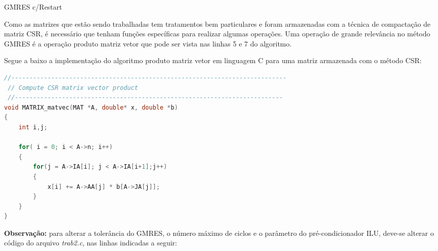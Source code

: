 \documentclass[
	11pt,				%
	oneside,			%
	a4paper,			%
	english,			%
	brazil,				%
	]{article}
\begin{document}
\begin{algorithm}[H]
	\caption{GMRES c/Restart}
\end{algorithm}

Como as matrizes que estão sendo trabalhadas tem tratamentos bem particulares e foram armazenadas com a técnica de compactação de matriz CSR, é necessário que tenham funções específicas para realizar algumas operações. Uma operação de grande relevância no método GMRES é a operação produto matriz vetor que pode ser vista nas linhas 5 e 7 do algoritmo.

Segue a baixo a implementação do algoritmo produto matriz vetor em linguagem C para uma matriz armazenada com o método CSR:

\begin{lstlisting}[language=C, caption=Produto Matriz Vetor (CSR)]
//----------------------------------------------------------------------------
 // Compute CSR matrix vector product
 //--------------------------------------------------------------------------
void MATRIX_matvec(MAT *A, double* x, double *b)
{
	int i,j;

	for( i = 0; i < A->n; i++)
	{
		for(j = A->IA[i]; j < A->IA[i+1];j++)
		{
			x[i] += A->AA[j] * b[A->JA[j]];
		}
	}
}
\end{lstlisting}

\textbf{Observação:} para alterar a tolerância do GMRES, o número máximo de ciclos e o parâmetro do pré-condicionador ILU, deve-se alterar o código do arquivo \textit{trab2.c}, nas linhas indicadas a seguir:
\end{document}
